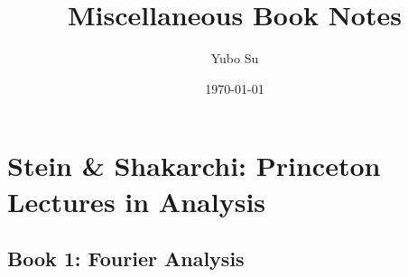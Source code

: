 \documentclass[11pt,
        usenames, %
        dvipsnames %
    ]{report}
\begin{document}
\def\Snospace~{\S{}} %
\renewcommand*{\sectionautorefname}{\Snospace}
\renewcommand*{\appendixautorefname}{\Snospace}
\renewcommand*{\figureautorefname}{Fig.}
\renewcommand*{\equationautorefname}{Eq.}
\renewcommand*{\tableautorefname}{Tab.}

\pagestyle{fancy}
\rhead{}
\cfoot{\thepage/\pageref{LastPage}}

\title{Miscellaneous Book Notes}
\author{Yubo Su}
\date{\today}

\maketitle

\chapter{Stein \& Shakarchi: Princeton Lectures in Analysis}

\section{Book 1: Fourier Analysis}
\end{document}

